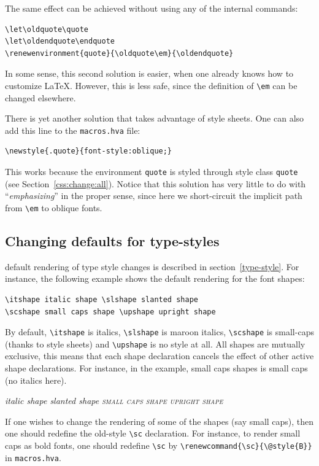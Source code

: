The same effect can be achieved without using any of the internal
commands:
\begin{verbatim}
\let\oldquote\quote
\let\oldendquote\endquote
\renewenvironment{quote}{\oldquote\em}{\oldendquote}
\end{verbatim}
In some sense, this second 
solution is easier, when one already knows
how to customize \LaTeX{}. However, this is less safe, since the definition of
\verb+\em+ can be changed elsewhere.

There is yet another solution that takes advantage of style sheets.
One can also add this line to the \texttt{macros.hva} file:
\begin{verbatim}
\newstyle{.quote}{font-style:oblique;}
\end{verbatim}
This works because the environment \texttt{quote} is styled through
style class \texttt{quote} (see Section~\ref{css:change:all}).
Notice that this solution has very little to do with
``\emph{emphasizing}'' in the proper sense, since here we
short-circuit the implicit path from \verb+\em+ to oblique fonts.


\subsection{Changing defaults for type-styles}\label{customize-style}
\hevea{} default rendering of type style changes is described in
section~\ref{type-style}.
For instance, the following example shows the default rendering
for the font shapes:
\begin{verbatim}
\itshape italic shape \slshape slanted shape
\scshape small caps shape \upshape upright shape
\end{verbatim}
By default, \verb+\itshape+ is italics, \verb+\slshape+ is maroon
italics, \verb+\scshape+ is small-caps (thanks to style sheets) and \verb+\upshape+ is no style at all.
All shapes are mutually exclusive, this means that each shape
declaration cancels the effect of other active shape declarations.
For instance, in the example, small caps shapes is small caps (no italics here).
\begin{htmlonly}
\begin{htmlout}
\itshape italic shape \slshape slanted shape
\scshape small caps shape \upshape upright shape
\end{htmlout}
\end{htmlonly}

If one wishes to change the rendering of some of the shapes (say small
caps), then one should redefine the old-style \verb+\sc+ declaration.
For instance, to render small caps as bold fonts, one should
redefine \verb+\sc+ by \verb+\renewcommand{\sc}{\@style{B}}+ in
\texttt{macros.hva}.


